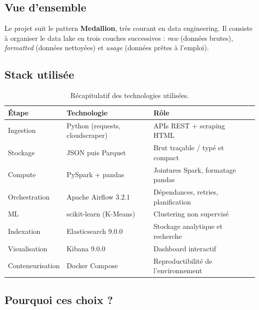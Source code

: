 \documentclass[11pt,a4paper]{article}
\begin{document}
\subsection*{Vue d'ensemble}

Le projet suit le pattern \textbf{Medallion}, très courant en data engineering.
Il consiste à organiser le data lake en trois couches successives : \textit{raw}
(données brutes), \textit{formatted} (données nettoyées) et \textit{usage}
(données prêtes à l'emploi).

\subsection*{Stack utilisée}

\begin{table}[h]
\centering
\small
\begin{tabularx}{\textwidth}{@{}lllX@{}}
\toprule
\textbf{Étape} & \textbf{Technologie} & \textbf{Rôle} \\
\midrule
Ingestion       & Python (requests, cloudscraper) & APIs REST + scraping HTML \\
Stockage        & JSON puis Parquet               & Brut traçable / typé et compact \\
Compute         & PySpark + pandas                & Jointures Spark, formatage pandas \\
Orchestration   & Apache Airflow 3.2.1            & Dépendances, retries, planification \\
ML              & scikit-learn (K-Means)          & Clustering non supervisé \\
Indexation      & Elasticsearch 9.0.0             & Stockage analytique et recherche \\
Visualisation   & Kibana 9.0.0                    & Dashboard interactif \\
Conteneurisation & Docker Compose                 & Reproductibilité de l'environnement \\
\bottomrule
\end{tabularx}
\caption{Récapitulatif des technologies utilisées.}
\end{table}

\subsection*{Pourquoi ces choix ?}
\end{document}
